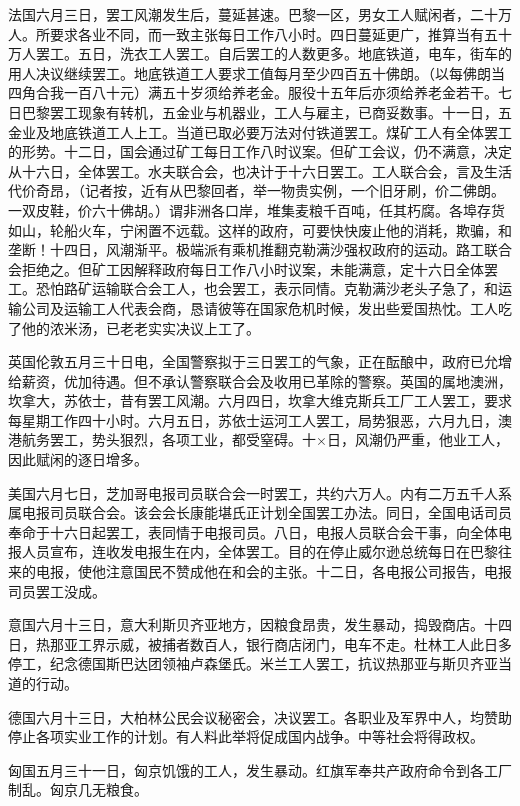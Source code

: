 法国\quad{}六月三日，罢工风潮发生后，蔓延甚速。巴黎一区，男女工人赋闲者，二十万人。所要求各业不同，而一致主张每日工作八小时。四日蔓延更广，推算当有五十万人罢工。五日，洗衣工人罢工。自后罢工的人数更多。地底铁道，电车，街车的用人决议继续罢工。地底铁道工人要求工值每月至少四百五十佛朗。（以每佛朗当四角合我一百八十元）满五十岁须给养老金。服役十五年后亦须给养老金若干。七日巴黎罢工现象有转机，五金业与机器业，工人与雇主，已商妥数事。十一日，五金业及地底铁道工人上工。当道已取必要万法对付铁道罢工。煤矿工人有全体罢工的形势。十二日，国会通过矿工每日工作八时议案。但矿工会议，仍不满意，决定从十六日，全体罢工。水夫联合会，也决计于十六日罢工。工人联合会，言及生活代价奇昂，（记者按，近有从巴黎回者，举一物贵实例，一个旧牙刷，价二佛朗。一双皮鞋，价六十佛胡。）谓非洲各口岸，堆集麦粮千百吨，任其朽腐。各埠存货如山，轮船火车，宁闲置不远载。这样的政府，可要快快废止他的消耗，欺骗，和垄断！十四日，风潮渐平。极端派有乘机推翻克勒满沙强权政府的运动。路工联合会拒绝之。但矿工因解释政府每日工作八小时议案，未能满意，定十六日全体罢工。恐怕路矿运输联合会工人，也会罢工，表示同情。克勒满沙老头子急了，和运输公司及运输工人代表会商，恳请彼等在国家危机时候，发出些爱国热忱。工人吃了他的浓米汤，已老老实实决议上工了。

英国\quad{}伦敦五月三十日电，全国警察拟于三日罢工的气象，正在酝酿中，政府已允增给薪资，优加待遇。但不承认警察联合会及收用已革除的警察。英国的属地澳洲，坎拿大，苏依士，昔有罢工风潮。六月四日，坎拿大维克斯兵工厂工人罢工，要求每星期工作四十小时。六月五日，苏依士运河工人罢工，局势狠恶，六月九日，澳港航务罢工，势头狠烈，各项工业，都受窒碍。十×日，风潮仍严重，他业工人，因此赋闲的逐日增多。

美国\quad{}六月七日，芝加哥电报司员联合会一时罢工，共约六万人。内有二万五千人系属电报司员联合会。该会会长康能堪氏正计划全国罢工办法。同日，全国电话司员奉命于十六日起罢工，表同情于电报司员。八日，电报人员联合会干事，向全体电报人员宣布，连收发电报生在内，全体罢工。目的在停止威尔逊总统每日在巴黎往来的电报，使他注意国民不赞成他在和会的主张。十二日，各电报公司报告，电报司员罢工没成。

意国\quad{}六月十三日，意大利斯贝齐亚地方，因粮食昂贵，发生暴动，捣毁商店。十四日，热那亚工界示威，被捕者数百人，银行商店闭门，电车不走。杜林工人此日多停工，纪念德国斯巴达团领袖卢森堡氏。米兰工人罢工，抗议热那亚与斯贝齐亚当道的行动。

德国\quad{}六月十三日，大柏林公民会议秘密会，决议罢工。各职业及军界中人，均赞助停止各项实业工作的计划。有人料此举将促成国内战争。中等社会将得政权。

匈国\quad{}五月三十一日，匈京饥饿的工人，发生暴动。红旗军奉共产政府命令到各工厂制乱。匈京几无粮食。

